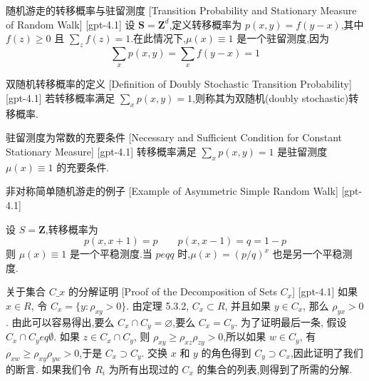 \documentclass[UTF8]{ctexart}
\begin{document}
    
    
    \begin{dfn}
        {随机游走的转移概率与驻留测度}
        [Transition Probability and Stationary Measure of Random Walk]
        [gpt-4.1]
        设 ${\boldsymbol{S}} = \mathbf{Z}^{d}$,定义转移概率为 $p(x, y) = f(y-x)$,其中 $f(z) \geq 0$ 且 $\sum_z f(z) = 1$.在此情况下,$\mu(x) \equiv 1$ 是一个驻留测度,因为
\[
\sum_{x} p(x, y) = \sum_{x} f(y - x) = 1
\]

    \end{dfn}
    
    
    
    \begin{dfn}
        {双随机转移概率的定义}
        [Definition of Doubly Stochastic Transition Probability]
        [gpt-4.1]
        若转移概率满足 $\sum_{x} p(x, y) = 1$,则称其为双随机(doubly stochastic)转移概率.
    \end{dfn}
    
    
    
    \begin{thm}
        {驻留测度为常数的充要条件}
        [Necessary and Sufficient Condition for Constant Stationary Measure]
        [gpt-4.1]
        转移概率满足 $\sum_{x} p(x, y) = 1$ 是驻留测度 $\mu(x) \equiv 1$ 的充要条件.
    \end{thm}
    
    
    
    \begin{xmp}
        {非对称简单随机游走的例子}
        [Example of Asymmetric Simple Random Walk]
        [gpt-4.1]
        
设 $S = \mathbf{Z}$,转移概率为
\[
p(x, x+1) = p \qquad p(x, x-1) = q = 1 - p
\]
则 $\mu(x) \equiv 1$ 是一个平稳测度.当 $p 
eq q$ 时,$\mu(x) = (p/q)^{x}$ 也是另一个平稳测度.

    \end{xmp}
    
    
    
    \begin{prf}
        {关于集合 $C\_x$ 的分解证明}
        [Proof of the Decomposition of Sets $C_x$]
        [gpt-4.1]
        如果 $x \in R$, 令 $C_x = \{ y : \rho_{xy} > 0 \}$.
由定理 5.3.2, $C_x \subset R$, 并且如果 $y \in C_x$, 那么 $\rho_{yx} > 0$.
由此可以容易得出,要么 $C_x \cap C_y = \varnothing$,要么 $C_x = C_y$.
为了证明最后一条, 假设 $C_x \cap C_y 
eq \emptyset$.
如果 $z \in C_x \cap C_y$, 则 $\rho_{xy} \geq \rho_{xz} \rho_{zy} > 0$,所以如果 $w \in C_y$, 有 $\rho_{xw} \geq \rho_{xy} \rho_{yw} > 0$,于是 $C_x \supset C_y$.
交换 $x$ 和 $y$ 的角色得到 $C_y \supset C_x$,因此证明了我们的断言.
如果我们令 $R_i$ 为所有出现过的 $C_x$ 的集合的列表,则得到了所需的分解.
    \end{prf}
    
\end{document}
